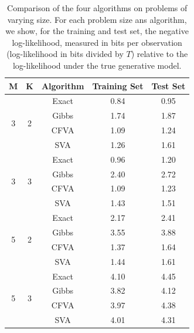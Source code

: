 \documentclass{article}
\begin{document}
\begin{table}
\centering
\begin{tabular}{cclll}
\hline
\ttfamily M & \ttfamily K & \ttfamily Algorithm & \ttfamily Training Set & \ttfamily Test Set \\
\hline
\multirow{4}{*}{3}  & \multirow{4}{*}{2} 
& \multicolumn{1}{c}{Exact} & \multicolumn{1}{c}{0.84}  & \multicolumn{1}{c}{0.95}
\\ \cline{3-5}
&	 & \multicolumn{1}{c}{Gibbs} & \multicolumn{1}{c}{1.74} & \multicolumn{1}{c}{1.87}
\\ \cline{3-5}
&   & \multicolumn{1}{c}{CFVA} & \multicolumn{1}{c}{1.09} & \multicolumn{1}{c}{1.24} 
\\ \cline{3-5}
&    & \multicolumn{1}{c}{SVA} & \multicolumn{1}{c}{1.26} & \multicolumn{1}{c}{1.61} \\ 
\hline
  \multirow{4}{*}{3}  & \multirow{4}{*}{3} 
& \multicolumn{1}{c}{Exact} & \multicolumn{1}{c}{0.96}  & \multicolumn{1}{c}{1.20}
\\ \cline{3-5}
&	 & \multicolumn{1}{c}{Gibbs} & \multicolumn{1}{c}{2.40} & \multicolumn{1}{c}{2.72}
\\ \cline{3-5}
&   & \multicolumn{1}{c}{CFVA} & \multicolumn{1}{c}{1.09} & \multicolumn{1}{c}{1.23} 
\\ \cline{3-5}
&    & \multicolumn{1}{c}{SVA} & \multicolumn{1}{c}{1.43} & \multicolumn{1}{c}{1.51} \\ 
\hline
\multirow{4}{*}{5}  & \multirow{4}{*}{2} 
& \multicolumn{1}{c}{Exact} & \multicolumn{1}{c}{2.17}  & \multicolumn{1}{c}{2.41}
\\ \cline{3-5}
&	 & \multicolumn{1}{c}{Gibbs} & \multicolumn{1}{c}{3.55} & \multicolumn{1}{c}{3.88}
\\ \cline{3-5}
&   & \multicolumn{1}{c}{CFVA} & \multicolumn{1}{c}{1.37} & \multicolumn{1}{c}{1.64} 
\\ \cline{3-5}
&    & \multicolumn{1}{c}{SVA} & \multicolumn{1}{c}{1.44} & \multicolumn{1}{c}{1.61} \\ 
\hline
\multirow{4}{*}{5}  & \multirow{4}{*}{3} 
& \multicolumn{1}{c}{Exact} & \multicolumn{1}{c}{4.10}  & \multicolumn{1}{c}{4.45}
\\ \cline{3-5}
&	 & \multicolumn{1}{c}{Gibbs} & \multicolumn{1}{c}{3.82} & \multicolumn{1}{c}{4.12}
\\ \cline{3-5}
&   & \multicolumn{1}{c}{CFVA} & \multicolumn{1}{c}{3.97} & \multicolumn{1}{c}{4.38} 
\\ \cline{3-5}
&    & \multicolumn{1}{c}{SVA} & \multicolumn{1}{c}{4.01} & \multicolumn{1}{c}{4.31} \\  
\hline 
\end{tabular}
\caption{Comparison of the four algorithms on problems of varying size. For each problem size ans algorithm, we show, for the training and test set, the negative log-likelihood, measured in bits per observation (log-likelihood in bits divided by $T$) relative to the log-likelihood under the true generative model.}
\label{tab1}
\end{table}
\end{document}
